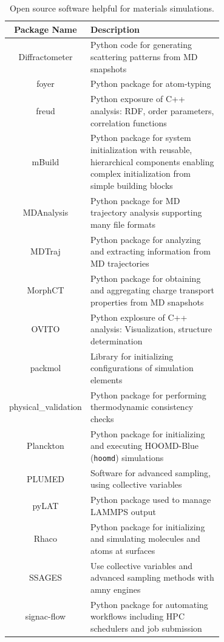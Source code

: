 \begin{table}
\caption{Open source software helpful for materials simulations.}
\centering
\begin{tabular}{|c|p{0.7\linewidth}|}
\hline
Package Name & Description  \\
\hline Diffractometer\cite{Jones2017, Diffract} & Python code for generating scattering patterns from MD snapshots  \\
\hline foyer\cite{Klein2018b} & Python package for atom-typing  \\
\hline freud\cite{Harper2016} & Python exposure of C++ analysis: RDF, order parameters, correlation functions   \\
\hline mBuild\cite{Klein2016mBuild} & Python package for system initialization with reusable, hierarchical components enabling complex initialization from simple building blocks \\
\hline MDAnalysis\cite{Gowers2016} & Python package for MD trajectory analysis supporting many file formats  \\
\hline MDTraj\cite{McGibbon2015} & Python package for analyzing and extracting information from MD trajectories  \\
\hline MorphCT\cite{Jones2017, MorphCT} & Python package for obtaining and aggregating charge transport properties from MD snapshots  \\
    \hline OVITO\cite{Stukowski2010} & Python explosure of C++ analysis: Visualization, structure determination \\
\hline packmol\cite{Martinez2009} & Library for initializing configurations of simulation elements\\
\hline physical\_validation\cite{Merz2018} & Python package for performing thermodynamic consistency checks \\ 
\hline Planckton\cite{planckton} & Python package for initializing and executing HOOMD-Blue (\texttt{hoomd}) simulations \\ 
\hline PLUMED\cite{Tribello2014} & Software for advanced sampling, using collective variables \\ 
\hline pyLAT\cite{Humbert2019} & Python package used to manage LAMMPS output \\
\hline Rhaco\cite{Rhaco} & Python package for initializing and simulating molecules and atoms at surfaces \\
\hline SSAGES\cite{Sidky2018} & Use collective variables and advanced sampling methods with amny engines \\
\hline signac-flow\cite{Adorf2018,signac_zenodo} & Python package for automating workflows including HPC schedulers and job submission \\

\end{tabular}
\end{table}
